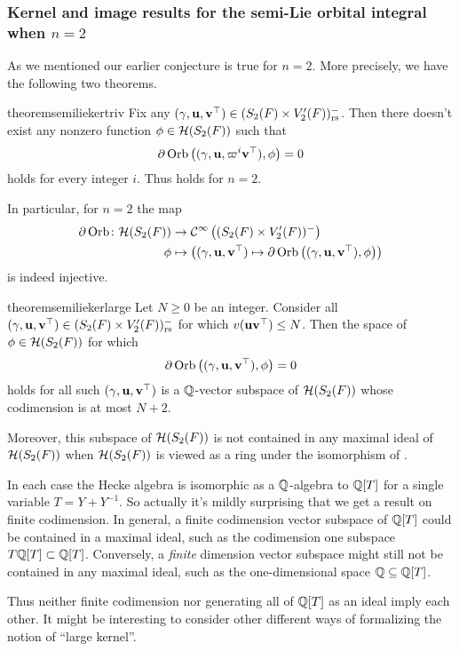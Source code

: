 \subsubsection{Kernel and image results for the semi-Lie orbital integral when $n=2$}
As we mentioned our earlier conjecture 
is true for $n = 2$.
More precisely, we have the following two theorems.

\begin{restatable}{theorem}{semiliekertriv}
  \label{thm:semi_lie_ker_trivial}
  Fix any ${(\gamma, \mathbf u, \mathbf v^\top)} \in (S_2(F) \times V'_2(F))_{\mathrm{rs}}^-$.
  Then there doesn't exist any nonzero function $\phi \in \mathcal H(S_2(F))$ such that
  \[ \partial \operatorname{Orb} \left( (\gamma, \mathbf u, \varpi^i \mathbf v^\top), \phi \right) = 0 \]
  holds for every integer $i$.
  Thus  holds for $n = 2$.
\end{restatable}

In particular, for $n=2$ the map
\begin{align*}
  \partial\operatorname{Orb} \colon \mathcal H(S_2(F)) &\to \mathcal{C}^\infty\left( (S_2(F) \times V'_2(F))^- \right) \\
  \phi &\mapsto \left( {(\gamma, \mathbf u, \mathbf v^\top)} \mapsto \partial \operatorname{Orb} \left({(\gamma, \mathbf u, \mathbf v^\top)}, \phi \right) \right)
\end{align*}
is indeed injective.

\begin{restatable}{theorem}{semiliekerlarge}
  \label{thm:semi_lie_ker_huge}
  Let $N \ge 0$ be an integer.
  Consider all ${(\gamma, \mathbf u, \mathbf v^\top)} \in (S_2(F) \times V'_2(F))_{\mathrm{rs}}^-$ for which $v(\mathbf u\mathbf v^\top) \le N$.
  Then the space of $\phi \in \mathcal H(S_2(F))$ for which
  \[ \partial \operatorname{Orb} \left( {(\gamma, \mathbf u, \mathbf v^\top)}, \phi \right) = 0 \]
  holds for all such ${(\gamma, \mathbf u, \mathbf v^\top)}$ is a $\mathbb Q$-vector subspace of $\mathcal H(S_2(F))$
  whose codimension is at most $N + 2$.

  Moreover, this subspace of $\mathcal H(S_2(F))$
  is not contained in any maximal ideal of $\mathcal H(S_2(F))$
  when $\mathcal H(S_2(F))$ is viewed as a ring under the isomorphism of .
\end{restatable}

\begin{remark}
  In each case the Hecke algebra is isomorphic as a $\mathbb Q$-algebra to $\mathbb Q[T]$
  for a single variable $T = Y+Y^{-1}$.
  So actually it's mildly surprising that we get a result on finite codimension.
  In general, a finite codimension vector subspace of $\mathbb Q[T]$ could
  be contained in a maximal ideal,
  such as the codimension one subspace $T \mathbb Q[T] \subset \mathbb Q[T]$.
  Conversely, a \emph{finite} dimension vector subspace might still
  not be contained in any maximal ideal,
  such as the one-dimensional space $\mathbb Q \subseteq \mathbb Q[T]$.

  Thus neither finite codimension nor generating all of $\mathbb Q[T]$ as an ideal imply each other.
  It might be interesting to consider other different ways
  of formalizing the notion of ``large kernel''.
\end{remark}

